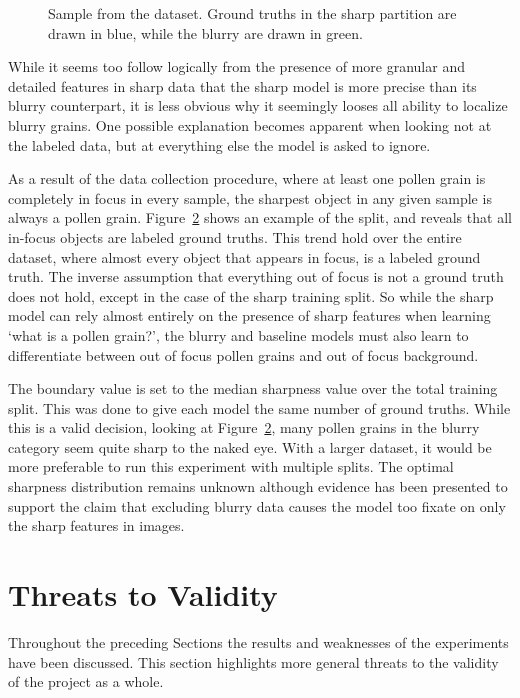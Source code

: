 \begin{figure}[htbp]
\begin{subfigure}[t]{0.35\textwidth}
    \label{fig:results-sharpness-blurry}
  \end{subfigure}
  \caption[Data sample showing split between sharp and blurry data]{%
Sample from the dataset. Ground truths in the sharp partition are drawn in \textcolor{poaceae}{blue}, while the blurry are drawn in \textcolor{alnus}{green}.
  }\label{fig:results-sharp-gt}
\end{figure}

While it seems too follow logically from the presence of more granular and detailed features in sharp data that the sharp model is more precise than its blurry counterpart, it is less obvious why it seemingly looses all ability to localize blurry grains.
One possible explanation becomes apparent when looking not at the labeled data, but at everything else the model is asked to ignore.

As a result of the data collection procedure, where at least one pollen grain is completely in focus in every sample, the sharpest object in any given sample is always a pollen grain.
Figure~\ref{fig:results-sharp-gt} shows an example of the split, and reveals that all in-focus objects are labeled ground truths.
This trend hold over the entire dataset, where almost every object that appears in focus, is a labeled ground truth.
The inverse assumption that everything out of focus is not a ground truth does not hold, except in the case of the sharp training split.
So while the sharp model can rely almost entirely on the presence of sharp features when learning `what is a pollen grain?', the blurry and baseline models must also learn to differentiate between out of focus pollen grains and out of focus background.

The boundary value is set to the median sharpness value over the total training split.
This was done to give each model the same number of ground truths.
While this is a valid decision, looking at Figure~\ref{fig:results-sharp-gt}, many pollen grains in the blurry category seem quite sharp to the naked eye.
With a larger dataset, it would be more preferable to run this experiment with multiple splits.
The optimal sharpness distribution remains unknown although evidence has been presented to support the claim that excluding blurry data causes the model too fixate on only the sharp features in images.

\section{Threats to Validity}\label{sec:results-validity}
Throughout the preceding Sections the results and weaknesses of the experiments have been discussed.
This section highlights more general threats to the validity of the project as a whole.

